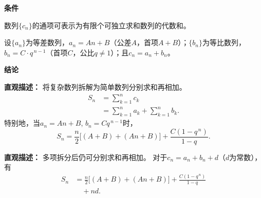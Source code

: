 \begin{statementbox}
	\textbf{\textcolor{CStatement}{条件}}
	\begin{description}[style=nextline, leftmargin=2.8em, labelsep=0.5em, itemsep=0.35em]
		\item[\textbf{\textcolor{CStatement}{条件1（通项可拆分）：}}]
			数列$\{c_n\}$的通项可表示为有限个可独立求和数列的代数和。
		\item[\textbf{\textcolor{CStatement}{条件2（等差和等比）：}}]
			设$\{a_n\}$为等差数列，$a_n=An+B$（公差$A$，首项$A+B$）；$\{b_n\}$为等比数列，$b_n=C\cdot q^{\,n-1}$（首项$C$，公比$q\neq1$）；且$c_n=a_n+b_n$。
	\end{description}
	\textbf{\textcolor{CStatement}{结论}}
	\begin{description}[style=nextline, leftmargin=2.8em, labelsep=0.5em, itemsep=0.45em]
		\item[\textbf{\textcolor{CStatement}{结论一（分组求和法）：}}]
			\textbf{\textcolor{CStatement}{直观描述：}}
			将复杂数列拆解为简单数列分别求和再相加。
			\[
				\begin{aligned}
					S_n &= \sum_{k=1}^{n}c_k \\ &= \sum_{k=1}^{n}a_k + \sum_{k=1}^{n}b_k.
			\end{aligned}
			\]
			特别地，当$a_n=An+B$, $b_n=C q^{\,n-1}$时，
			\[
				\boxed{S_n = \frac{n}{2}\bigl[(A+B)+(An+B)\bigr] + \frac{C(1-q^{\,n})}{1-q}}.
			\]
		\item[\textbf{\textcolor{CStatement}{推广结论（线性组合）：}}]
			\textbf{\textcolor{CStatement}{直观描述：}}
			多项拆分后仍可分别求和再相加。 对于$c_n = a_n + b_n + d$（$d$为常数），有
			\[
				\begin{aligned}
					S_n &= \frac{n}{2}\bigl[(A+B)+(An+B)\bigr] + \frac{C(1-q^{\,n})}{1-q} \\ &\quad + n d.
			\end{aligned}
			\]
	\end{description}

\end{statementbox}
